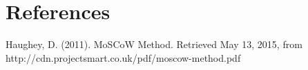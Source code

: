 \chapter{References}

Haughey, D. (2011). MoSCoW Method. Retrieved May 13, 2015, from http://cdn.projectsmart.co.uk/pdf/moscow-method.pdf

